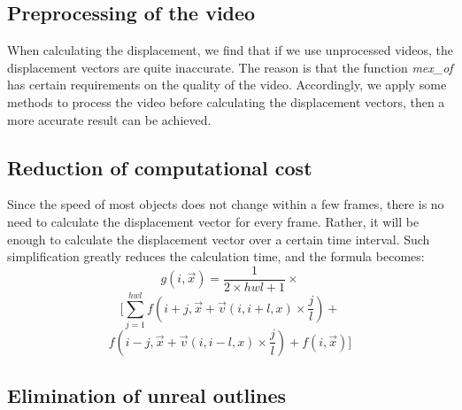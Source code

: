 \documentclass[10pt,twocolumn,letterpaper]{article}
\begin{document}
\subsection{Preprocessing of the video}

When calculating the displacement, we find that if we use unprocessed videos, the displacement vectors are quite inaccurate. The reason is that the function \emph{mex\_of} has certain requirements on the quality of the video. Accordingly, we apply some methods to process the video before calculating the displacement vectors, then a more accurate result can be achieved.
 
\subsection{Reduction of computational cost}

Since the speed of most objects does not change within a few frames, there is no need to calculate the displacement vector for every frame. Rather, it will be enough to calculate the displacement vector over a certain time interval. Such simplification greatly reduces the calculation time, and the formula becomes:
$$g(i,\Vec{x}) = \frac{1}{2\times hwl+1}\times$$
$$[\sum_{j=1}^{hwl} f(i+j,\Vec{x}+\Vec{v}(i,i+l,x)\times\frac{j}{l})+$$
$$f(i-j,\Vec{x}+\Vec{v}(i,i-l,x)\times\frac{j}{l})+f(i,\Vec{x})]$$

\subsection{Elimination of unreal outlines}
\end{document}
